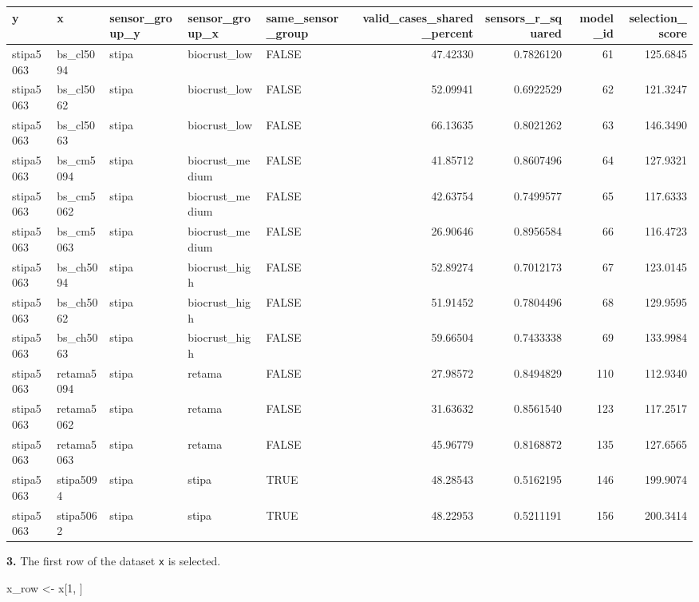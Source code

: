 \documentclass[]{article}
\newenvironment{Shaded}{\begin{snugshade}}{\end{snugshade}}
\newcommand{\DecValTok}[1]{\textcolor[rgb]{0.00,0.00,0.81}{#1}}
\newcommand{\NormalTok}[1]{#1}
\newcommand{\StringTok}[1]{\textcolor[rgb]{0.31,0.60,0.02}{#1}}
\begin{document}
\begin{tabular}[t]{l|l|l|l|l|r|r|r|r}
\hline
y & x & sensor\_group\_y & sensor\_group\_x & same\_sensor\_group & valid\_cases\_shared\_percent & sensors\_r\_squared & model\_id & selection\_score\\
\hline
stipa5063 & bs\_cl5094 & stipa & biocrust\_low & FALSE & 47.42330 & 0.7826120 & 61 & 125.6845\\
\hline
stipa5063 & bs\_cl5062 & stipa & biocrust\_low & FALSE & 52.09941 & 0.6922529 & 62 & 121.3247\\
\hline
stipa5063 & bs\_cl5063 & stipa & biocrust\_low & FALSE & 66.13635 & 0.8021262 & 63 & 146.3490\\
\hline
stipa5063 & bs\_cm5094 & stipa & biocrust\_medium & FALSE & 41.85712 & 0.8607496 & 64 & 127.9321\\
\hline
stipa5063 & bs\_cm5062 & stipa & biocrust\_medium & FALSE & 42.63754 & 0.7499577 & 65 & 117.6333\\
\hline
stipa5063 & bs\_cm5063 & stipa & biocrust\_medium & FALSE & 26.90646 & 0.8956584 & 66 & 116.4723\\
\hline
stipa5063 & bs\_ch5094 & stipa & biocrust\_high & FALSE & 52.89274 & 0.7012173 & 67 & 123.0145\\
\hline
stipa5063 & bs\_ch5062 & stipa & biocrust\_high & FALSE & 51.91452 & 0.7804496 & 68 & 129.9595\\
\hline
stipa5063 & bs\_ch5063 & stipa & biocrust\_high & FALSE & 59.66504 & 0.7433338 & 69 & 133.9984\\
\hline
stipa5063 & retama5094 & stipa & retama & FALSE & 27.98572 & 0.8494829 & 110 & 112.9340\\
\hline
stipa5063 & retama5062 & stipa & retama & FALSE & 31.63632 & 0.8561540 & 123 & 117.2517\\
\hline
stipa5063 & retama5063 & stipa & retama & FALSE & 45.96779 & 0.8168872 & 135 & 127.6565\\
\hline
stipa5063 & stipa5094 & stipa & stipa & TRUE & 48.28543 & 0.5162195 & 146 & 199.9074\\
\hline
stipa5063 & stipa5062 & stipa & stipa & TRUE & 48.22953 & 0.5211191 & 156 & 200.3414\\
\hline
\end{tabular}

\textbf{3.} The first row of the dataset \texttt{x} is selected.

\begin{Shaded}
\begin{Highlighting}[]
\NormalTok{x_row <-}\StringTok{ }\NormalTok{x[}\DecValTok{1}\NormalTok{, ]}
\end{Highlighting}
\end{Shaded}
\end{document}

